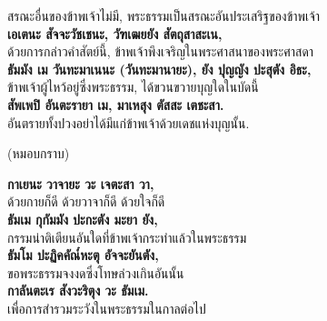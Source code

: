 \documentclass[12pt]{article}
\begin{document}
\indent สรณะอื่นของข้าพเจ้าไม่มี, พระธรรมเป็นสรณะอันประเสริฐของข้าพเจ้า\\
\textbf{เอเตนะ สัจจะวัชเชนะ, วัฑเฒยยัง สัตถุสาสะเน,}\\
\indent ด้วยการกล่าวคำสัตย์นี้, ข้าพเจ้าพึงเจริญในพระศาสนาของพระศาสดา\\
\textbf{ธัมมัง เม วันทะมาเนนะ (วันทะมานายะ), ยัง ปุญญัง ปะสุตัง อิธะ,}\\
\indent ข้าพเจ้าผู้ไหว้อยู่ซึ่งพระธรรม, ได้ขวนขวายบุญใดในบัดนี้\\
\textbf{สัพเพปิ อันตะรายา เม, มาเหสุง ตัสสะ เตชะสา.}\\
\indent อันตรายทั้งปวงอย่าได้มีแก่ข้าพเจ้าด้วยเดชแห่งบุญนั้น.
\begin{center}
(หมอบกราบ)
\end{center}
\textbf{กาเยนะ วาจายะ วะ เจตะสา วา,}\\
\indent ด้วยกายก็ดี ด้วยวาจาก็ดี ด้วยใจก็ดี\\
\textbf{ธัมเม กุกัมมัง ปะกะตัง มะยา ยัง,}\\
\indent กรรมน่าติเตียนอันใดที่ข้าพเจ้ากระทำแล้วในพระธรรม\\
\textbf{ธัมโม ปะฏิคคัณ๎หะตุ อัจจะยันตัง,}\\
\indent ขอพระธรรมจงงดซึ่งโทษล่วงเกินอันนั้น\\
\textbf{กาลันตะเร สังวะริตุง วะ ธัมเม.}\\
\indent เพื่อการสำรวมระวังในพระธรรมในกาลต่อไป\\

\pagebreak
\end{document}
